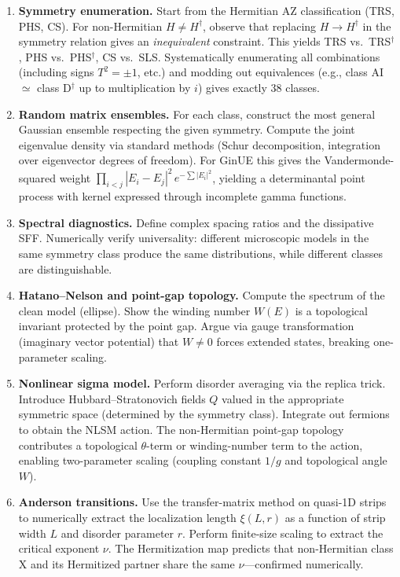 \documentclass[11pt,a4paper]{article}
\begin{document}
\begin{enumerate}
  \item \textbf{Symmetry enumeration.}
    Start from the Hermitian AZ classification (TRS, PHS, CS).  For non-Hermitian $H\neq H^\dagger$, observe that replacing $H\to H^\dagger$ in the symmetry relation gives an \emph{inequivalent} constraint.  This yields TRS vs.\ TRS$^\dagger$, PHS vs.\ PHS$^\dagger$, CS vs.\ SLS.  Systematically enumerating all combinations (including signs $T^2=\pm1$, etc.) and modding out equivalences (e.g., class AI $\simeq$ class D$^\dagger$ up to multiplication by $i$) gives exactly 38 classes.

  \item \textbf{Random matrix ensembles.}
    For each class, construct the most general Gaussian ensemble respecting the given symmetry.  Compute the joint eigenvalue density via standard methods (Schur decomposition, integration over eigenvector degrees of freedom).  For GinUE this gives the Vandermonde-squared weight $\prod_{i<j}|E_i-E_j|^2\,e^{-\sum|E_i|^2}$, yielding a determinantal point process with kernel expressed through incomplete gamma functions.

  \item \textbf{Spectral diagnostics.}
    Define complex spacing ratios and the dissipative SFF.  Numerically verify universality: different microscopic models in the same symmetry class produce the same distributions, while different classes are distinguishable.

  \item \textbf{Hatano--Nelson and point-gap topology.}
    Compute the spectrum of the clean model (ellipse).  Show the winding number $W(E)$ is a topological invariant protected by the point gap.  Argue via gauge transformation (imaginary vector potential) that $W\neq 0$ forces extended states, breaking one-parameter scaling.

  \item \textbf{Nonlinear sigma model.}
    Perform disorder averaging via the replica trick.  Introduce Hubbard--Stratonovich fields $Q$ valued in the appropriate symmetric space (determined by the symmetry class).  Integrate out fermions to obtain the NLSM action.  The non-Hermitian point-gap topology contributes a topological $\theta$-term or winding-number term to the action, enabling two-parameter scaling (coupling constant $1/g$ and topological angle $W$).

  \item \textbf{Anderson transitions.}
    Use the transfer-matrix method on quasi-1D strips to numerically extract the localization length $\xi(L,r)$ as a function of strip width $L$ and disorder parameter $r$.  Perform finite-size scaling to extract the critical exponent $\nu$.  The Hermitization map predicts that non-Hermitian class X and its Hermitized partner share the same $\nu$---confirmed numerically.


\end{enumerate}
\end{document}
